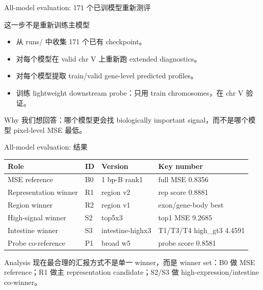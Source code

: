 \documentclass[UTF8,aspectratio=169,10pt]{ctexbeamer}
\begin{document}
\begin{frame}{All-model evaluation: 171 个已训模型重新测评}
  \begin{block}{这一步不是重新训练主模型}
    \begin{itemize}
      \item 从 runs/ 中收集 171 个已有 checkpoint。
      \item 对每个模型在 valid chr V 上重新跑 extended diagnostics。
      \item 对每个模型提取 train/valid gene-level predicted profiles。
      \item 训练 lightweight downstream probe：只用 train chromosomes，在 chr V 验证。
    \end{itemize}
  \end{block}

  \begin{block}{Why}
    我们想回答：哪个模型更会找 biologically important signal，而不是哪个模型 pixel-level MSE 最低。
  \end{block}
\end{frame}

\begin{frame}{All-model evaluation: 结果}
  \centering
  \begin{tabular}{llll}
    \toprule
    Role & ID & Version & Key number \\
    \midrule
    MSE reference & B0 & 1 bp-B rank1 & full MSE 0.8356 \\
    Representation winner & R1 & region v2 & rep score 0.8881 \\
    Region winner & R2 & region v1 & exon/gene-body best \\
    High-signal winner & S2 & top5x3 & top1 MSE 9.2685 \\
    Intestine winner & S3 & intestine-highx3 & T1/T3/T4 high\_gt3 4.4591 \\
    Probe co-reference & P1 & broad w5 & probe score 0.8581 \\
    \bottomrule
  \end{tabular}

  \vspace{0.8em}
  \begin{block}{Analysis}
    现在最合理的汇报方式不是单一 winner，而是 winner set：B0 做 MSE reference；R1 做主 representation candidate；S2/S3 做 high-expression/intestine co-winner。
  \end{block}
\end{frame}
\end{document}
